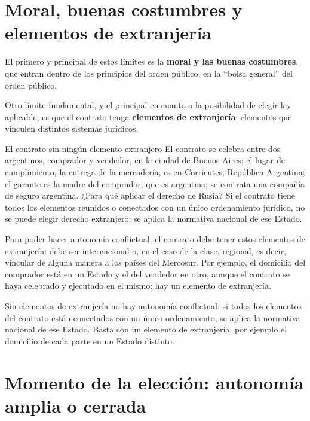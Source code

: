 \documentclass[12pt,oneside]{book}
\begin{document}
\section{Moral, buenas costumbres y elementos de extranjer\'ia}

El primero y principal de estos l\'imites es la \textbf{moral y las buenas costumbres}, que entran dentro de los principios del orden p\'ublico, en la ``bolsa general'' del orden p\'ublico.

Otro l\'imite fundamental, y el principal en cuanto a la posibilidad de elegir ley aplicable, es que el contrato tenga \textbf{elementos de extranjer\'ia}: elementos que vinculen distintos sistemas jur\'idicos.

\begin{example}{El contrato sin ning\'un elemento extranjero}
El contrato se celebra entre dos argentinos, comprador y vendedor, en la ciudad de Buenos Aires; el lugar de cumplimiento, la entrega de la mercader\'ia, es en Corrientes, Rep\'ublica Argentina; el garante es la madre del comprador, que es argentina; se contrata una compa\~n\'ia de seguro argentina. ¿Para qu\'e aplicar el derecho de Rusia? Si el contrato tiene todos los elementos reunidos o conectados con un \'unico ordenamiento jur\'idico, no se puede elegir derecho extranjero: se aplica la normativa nacional de ese Estado.
\end{example}

Para poder hacer autonom\'ia conflictual, el contrato debe tener estos elementos de extranjer\'ia: debe ser internacional o, en el caso de la clase, regional, es decir, vincular de alguna manera a los pa\'ises del Mercosur. Por ejemplo, el domicilio del comprador est\'a en un Estado y el del vendedor en otro, aunque el contrato se haya celebrado y ejecutado en el mismo: hay un elemento de extranjer\'ia.

\begin{important}
Sin elementos de extranjer\'ia no hay autonom\'ia conflictual: si todos los elementos del contrato est\'an conectados con un \'unico ordenamiento, se aplica la normativa nacional de ese Estado. Basta con un elemento de extranjer\'ia, por ejemplo el domicilio de cada parte en un Estado distinto.
\end{important}

\section{Momento de la elecci\'on: autonom\'ia amplia o cerrada}
\end{document}
